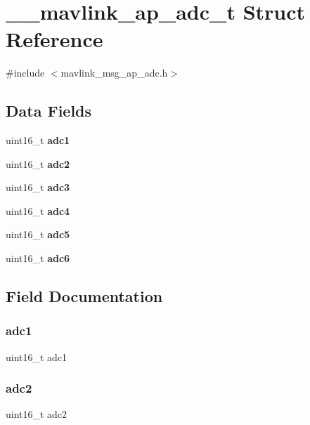 \section{\+\_\+\+\_\+mavlink\+\_\+ap\+\_\+adc\+\_\+t Struct Reference}
\label{struct____mavlink__ap__adc__t}


{\ttfamily \#include $<$mavlink\+\_\+msg\+\_\+ap\+\_\+adc.\+h$>$}

\subsection*{Data Fields}
\begin{DoxyCompactItemize}
\item 
uint16\+\_\+t \textbf{ adc1}
\item 
uint16\+\_\+t \textbf{ adc2}
\item 
uint16\+\_\+t \textbf{ adc3}
\item 
uint16\+\_\+t \textbf{ adc4}
\item 
uint16\+\_\+t \textbf{ adc5}
\item 
uint16\+\_\+t \textbf{ adc6}
\end{DoxyCompactItemize}


\subsection{Field Documentation}
\mbox{\label{struct____mavlink__ap__adc__t_a46fcb4a01c7f486a308e15b386a4d840}} 
\subsubsection{adc1}
{\footnotesize\ttfamily uint16\+\_\+t adc1}

\mbox{\label{struct____mavlink__ap__adc__t_a7cff0a4e9d0e27f27ac779d06dc3c38b}} 
\subsubsection{adc2}
{\footnotesize\ttfamily uint16\+\_\+t adc2}

